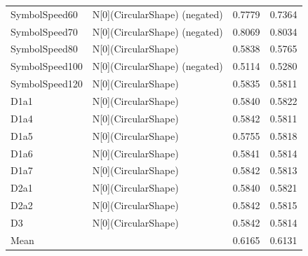 \begin{tabular}{llll}
SymbolSpeed60 & N[0](CircularShape) (negated) & 0.7779 & 0.7364 \\
SymbolSpeed70 & N[0](CircularShape) (negated) & 0.8069 & 0.8034 \\
SymbolSpeed80 & N[0](CircularShape) & 0.5838 & 0.5765 \\
SymbolSpeed100 & N[0](CircularShape) (negated) & 0.5114 & 0.5280 \\
SymbolSpeed120 & N[0](CircularShape) & 0.5835 & 0.5811 \\
D1a1 & N[0](CircularShape) & 0.5840 & 0.5822 \\
D1a4 & N[0](CircularShape) & 0.5842 & 0.5811 \\
D1a5 & N[0](CircularShape) & 0.5755 & 0.5818 \\
D1a6 & N[0](CircularShape) & 0.5841 & 0.5814 \\
D1a7 & N[0](CircularShape) & 0.5842 & 0.5813 \\
D2a1 & N[0](CircularShape) & 0.5840 & 0.5821 \\
D2a2 & N[0](CircularShape) & 0.5842 & 0.5815 \\
D3 & N[0](CircularShape) & 0.5842 & 0.5814 \\
Mean &  & 0.6165 & 0.6131 \\
\bottomrule
\end{tabular}

